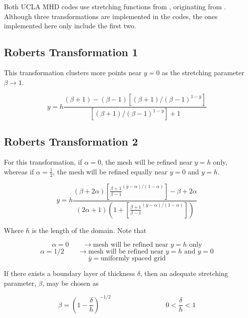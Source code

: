\documentclass[11pt]{article}
\begin{document}
Both UCLA MHD codes use stretching functions from \cite{pletcher2012computational}, originating from \cite{Roberts1971}. Although three transformations are implemented in the codes, the ones implemented here only include the first two.

\subsection{Roberts Transformation 1}

This transformation clusters more points near $y=0$ as the stretching parameter $\beta \rightarrow 1$.

\begin{equation}
	y
	=
	h
	\frac{(\beta+1)-(\beta-1) \left[ (\beta+1)/(\beta-1)^{1-\bar{y}} \right] }
	{\left[ (\beta+1)/(\beta-1)^{1-\bar{y}} \right]+1}
\end{equation}

\subsection{Roberts Transformation 2}
For this transformation, if $\alpha=0$, the mesh will be refined near $y=h$ only, whereas if $\alpha= \frac{1}{2}$, the mesh will be refined equally near $y=0$ and $y=h$.

\begin{equation}
	y
	=
	h
	\frac{
	(\beta + 2 \alpha)
	\left[ \frac{\beta+1}{\beta-1}^{(\bar{y}-\alpha)/(1-\alpha)} \right] - \beta + 2 \alpha}
	{
	(2\alpha+1)
	\left(1+\left[ \frac{\beta+1}{\beta-1}^{(\bar{y}-\alpha)/(1-\alpha)} \right]
	\right)
	}
\end{equation}

Where $h$ is the length of the domain. Note that

\begin{equation}
	\alpha = 0 \qquad \rightarrow \text{mesh will be refined near $y=h$ only}
\end{equation}
\begin{equation}
	\alpha = 1/2 \qquad \rightarrow \text{mesh will be refined near $y=h$ and $y=0$}
\end{equation}
\begin{equation}
	\bar{y} = \text{uniformly spaced grid}
\end{equation}

If there exists a boundary layer of thickness $\delta$, then an adequate stretching parameter, $\beta$, may be chosen as

\begin{equation}
	\beta = \left( 1 - \frac{\delta}{h} \right)^{-1/2}
	\qquad \qquad
	\qquad \qquad
	0 < \frac{\delta}{h} < 1
\end{equation}
\end{document}
